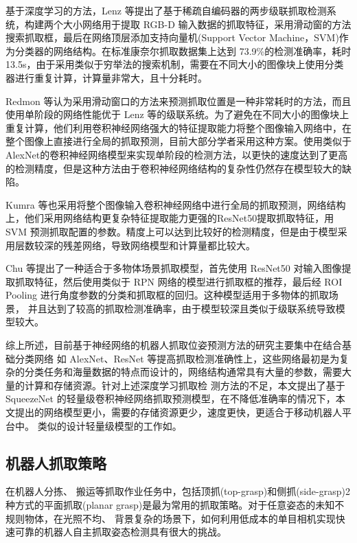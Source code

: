\documentclass[no-math,bwprint]{YangThesis}
\begin{document}
基于深度学习的方法，Lenz 等\cite{bib3}提出了基于稀疏自编码器的两步级联抓取检测系统，构建两个大小网络用于提取 RGB-D 输入数据的抓取特征，采用滑动窗的方法搜索抓取框，最后在网络顶层添加支持向量机(Support Vector Machine，SVM)作为分类器的网络结构。在标准康奈尔抓取数据集\cite{bib6}上达到 73.9\%的检测准确率，耗时13.5s，由于采用类似于穷举法的搜索机制，需要在不同大小的图像块上使用分类器进行重复计算，计算量非常大，且十分耗时。

Redmon 等\cite{bib7}认为采用滑动窗口的方法来预测抓取位置是一种非常耗时的方法，而且使用单阶段的网络性能优于 Lenz 等的级联系统。为了避免在不同大小的图像块上重复计算，他们利用卷积神经网络强大的特征提取能力将整个图像输入网络中，在整个图像上直接进行全局的抓取预测，目前大部分学者采用这种方案\cite{bib5,bib8}。使用类似于 AlexNet\cite{bib9}的卷积神经网络模型来实现单阶段的检测方法，以更快的速度达到了更高的检测精度，但是这种方法由于卷积神经网络结构的复杂性仍然存在模型较大的缺陷。 

Kumra 等\cite{bib4}也采用将整个图像输入卷积神经网络中进行全局的抓取预测，网络结构上，他们采用网络结构更复杂特征提取能力更强的ResNet50\cite{bib10}提取抓取特征，用 SVM 预测抓取配置的参数。精度上可以达到比较好的检测精度，但是由于模型采用层数较深的残差网络，导致网络模型和计算量都比较大。

Chu 等\cite{bib5}提出了一种适合于多物体场景抓取模型，首先使用 ResNet50 对输入图像提取抓取特征，然后使用类似于 RPN  网络的模型进行抓取框的推荐，最后经 ROI  Pooling 进行角度参数的分类和抓取框的回归。这种模型适用于多物体的抓取场景， 并且达到了较高的抓取检测准确率，由于模型较深且类似于级联系统导致模型较大。
 
综上所述，目前基于神经网络的机器人抓取位姿预测方法的研究主要集中在结合基础分类网络 如 AlexNet、ResNet 等提高抓取检测准确性上，这些网络最初是为复杂的分类任务和海量数据的特点而设计的，网络结构通常具有大量的参数，需要大量的计算和存储资源。针对上述深度学习抓取检 测方法的不足，本文提出了基于 SqueezeNet 的轻量级卷积神经网络抓取预测模型，在不降低准确率的情况下，本文提出的网络模型更小，需要的存储资源更少，速度更快，更适合于移动机器人平台中。 类似的设计轻量级模型的工作如\cite{bib11}。

\subsection{机器人抓取策略}
在机器人分拣、 搬运等抓取作业任务中，包括顶抓(top-grasp)和侧抓(side-grasp)2 种方式的平面抓取(planar grasp)是最为常用的抓取策略。对于任意姿态的未知不规则物体，在光照不均、 背景复杂的场景下，如何利用低成本的单目相机实现快速可靠的机器人自主抓取姿态检测具有很大的挑战。
\end{document}
